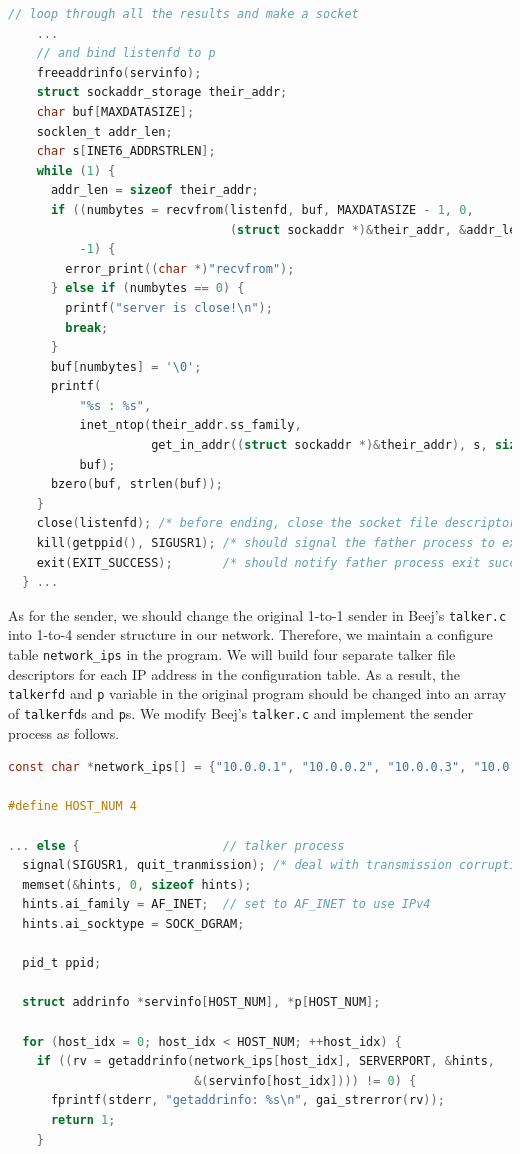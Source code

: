 \begin{exercise}[]
\begin{lstlisting}[language=C]
    // loop through all the results and make a socket
    ...
    // and bind listenfd to p 
    freeaddrinfo(servinfo);
    struct sockaddr_storage their_addr;
    char buf[MAXDATASIZE];
    socklen_t addr_len;
    char s[INET6_ADDRSTRLEN];
    while (1) {
      addr_len = sizeof their_addr;
      if ((numbytes = recvfrom(listenfd, buf, MAXDATASIZE - 1, 0,
                               (struct sockaddr *)&their_addr, &addr_len)) ==
          -1) {
        error_print((char *)"recvfrom");
      } else if (numbytes == 0) {
        printf("server is close!\n");
        break;
      }
      buf[numbytes] = '\0';
      printf(
          "%s : %s",
          inet_ntop(their_addr.ss_family,
                    get_in_addr((struct sockaddr *)&their_addr), s, sizeof s),
          buf);
      bzero(buf, strlen(buf));
    }
    close(listenfd); /* before ending, close the socket file descriptor */
    kill(getppid(), SIGUSR1); /* should signal the father process to exit */
    exit(EXIT_SUCCESS);       /* should notify father process exit success */
  } ... 
\end{lstlisting}

  As for the sender, we should change the original 1-to-1 sender in Beej's \texttt{talker.c} into 1-to-4 sender structure in our network. Therefore, we maintain a configure table \texttt{network\_ips} in the program. We will build four separate talker file descriptors for each IP address in the configuration table. As a result, the \texttt{talkerfd} and \texttt{p} variable in the original program should be changed into an array of \texttt{talkerfd}s and \texttt{p}s. We modify Beej's \texttt{talker.c} and implement the sender process as follows.

\begin{lstlisting}[language=C]
const char *network_ips[] = {"10.0.0.1", "10.0.0.2", "10.0.0.3", "10.0.0.4"};

#define HOST_NUM 4

... else {                    // talker process
  signal(SIGUSR1, quit_tranmission); /* deal with transmission corruption */
  memset(&hints, 0, sizeof hints);
  hints.ai_family = AF_INET;  // set to AF_INET to use IPv4
  hints.ai_socktype = SOCK_DGRAM;

  pid_t ppid;

  struct addrinfo *servinfo[HOST_NUM], *p[HOST_NUM];

  for (host_idx = 0; host_idx < HOST_NUM; ++host_idx) {
    if ((rv = getaddrinfo(network_ips[host_idx], SERVERPORT, &hints,
                          &(servinfo[host_idx]))) != 0) {
      fprintf(stderr, "getaddrinfo: %s\n", gai_strerror(rv));
      return 1;
    }


\end{lstlisting}
\end{exercise}
